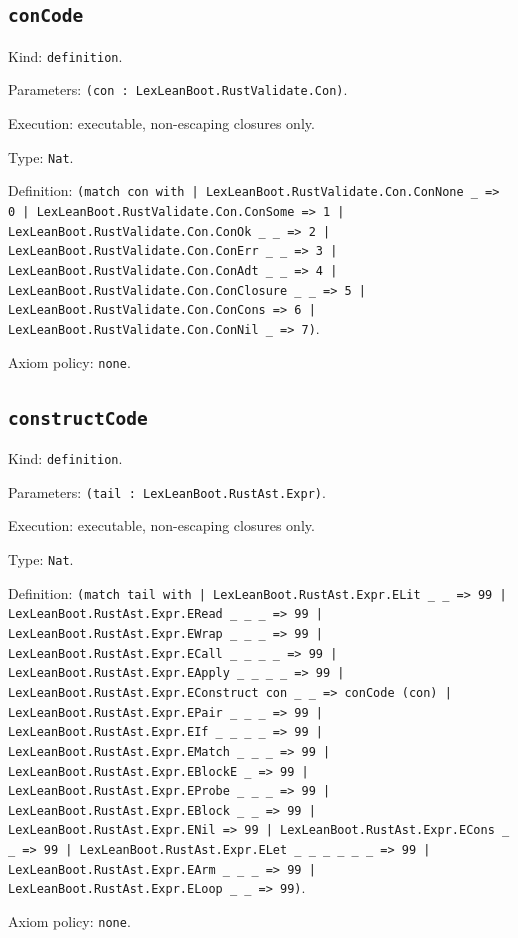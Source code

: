 \documentclass[11pt]{article}
\begin{document}
\subsection*{\texttt{conCode}}
\noindent Kind: \texttt{definition}.\par
\noindent Parameters: \texttt{(con : LexLeanBoot.RustValidate.Con)}.\par
\noindent Execution: executable, non-escaping closures only.\par
\noindent Type: \texttt{Nat}.\par
\noindent Definition: \texttt{(match con with | LexLeanBoot.RustValidate.Con.ConNone \_ => 0 | LexLeanBoot.RustValidate.Con.ConSome => 1 | LexLeanBoot.RustValidate.Con.ConOk \_ \_ => 2 | LexLeanBoot.RustValidate.Con.ConErr \_ \_ => 3 | LexLeanBoot.RustValidate.Con.ConAdt \_ \_ => 4 | LexLeanBoot.RustValidate.Con.ConClosure \_ \_ => 5 | LexLeanBoot.RustValidate.Con.ConCons => 6 | LexLeanBoot.RustValidate.Con.ConNil \_ => 7)}.\par
\noindent Axiom policy: \texttt{none}.\par
\subsection*{\texttt{constructCode}}
\noindent Kind: \texttt{definition}.\par
\noindent Parameters: \texttt{(tail : LexLeanBoot.RustAst.Expr)}.\par
\noindent Execution: executable, non-escaping closures only.\par
\noindent Type: \texttt{Nat}.\par
\noindent Definition: \texttt{(match tail with | LexLeanBoot.RustAst.Expr.ELit \_ \_ => 99 | LexLeanBoot.RustAst.Expr.ERead \_ \_ \_ => 99 | LexLeanBoot.RustAst.Expr.EWrap \_ \_ \_ => 99 | LexLeanBoot.RustAst.Expr.ECall \_ \_ \_ \_ => 99 | LexLeanBoot.RustAst.Expr.EApply \_ \_ \_ \_ => 99 | LexLeanBoot.RustAst.Expr.EConstruct con \_ \_ => conCode (con) | LexLeanBoot.RustAst.Expr.EPair \_ \_ \_ => 99 | LexLeanBoot.RustAst.Expr.EIf \_ \_ \_ \_ => 99 | LexLeanBoot.RustAst.Expr.EMatch \_ \_ \_ => 99 | LexLeanBoot.RustAst.Expr.EBlockE \_ => 99 | LexLeanBoot.RustAst.Expr.EProbe \_ \_ \_ => 99 | LexLeanBoot.RustAst.Expr.EBlock \_ \_ => 99 | LexLeanBoot.RustAst.Expr.ENil => 99 | LexLeanBoot.RustAst.Expr.ECons \_ \_ => 99 | LexLeanBoot.RustAst.Expr.ELet \_ \_ \_ \_ \_ \_ => 99 | LexLeanBoot.RustAst.Expr.EArm \_ \_ \_ => 99 | LexLeanBoot.RustAst.Expr.ELoop \_ \_ => 99)}.\par
\noindent Axiom policy: \texttt{none}.\par
\end{document}
